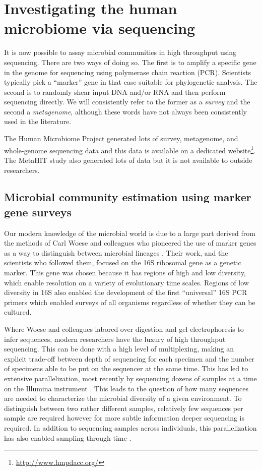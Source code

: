 \documentclass{amsart}
\begin{document}
\section{Investigating the human microbiome via sequencing}
It is now possible to assay microbial communities in high throughput using sequencing.
There are two ways of doing so.
The first is to amplify a specific gene in the genome for sequencing using polymerase chain reaction (PCR).
Scientists typically pick a ``marker'' gene in that case suitable for phylogenetic analysis.
The second is to randomly shear input DNA and/or RNA and then perform sequencing directly.
We will consistently refer to the former as a \textit{survey} and the second a \textit{metagenome}, although these words have not always been consistently used in the literature.

The Human Microbiome Project \citep{methe2012framework} generated lots of survey, metagenome, and whole-genome sequencing data and this data is available on a dedicated website\footnote{\url{http://www.hmpdacc.org/}}.
The MetaHIT study \citep{qin2010human} also generated lots of data but it is not available to outside researchers.

\subsection{Microbial community estimation using marker gene surveys}
Our modern knowledge of the microbial world is due to a large part derived from the methods of Carl Woese and colleagues who pioneered the use of marker genes as a way to distinguish between microbial lineages \citep{fox1977comparative}.
Their work, and the scientists who followed them, focused on the 16S ribosomal gene as a genetic marker.
This gene was chosen because it has regions of high and low diversity, which enable resolution on a variety of evolutionary time scales.
Regions of low diversity in 16S also enabled the development of the first ``universal'' 16S PCR primers \citep{lane1985rapid} which enabled surveys of all organisms regardless of whether they can be cultured.

Where Woese and colleagues labored over digestion and gel electrophoresis to infer sequences, modern researchers have the luxury of high throughput sequencing.
This can be done with a high level of multiplexing, making an explicit trade-off between depth of sequencing for each specimen and the number of specimens able to be put on the sequencer at the same time.
This has led to extensive parallelization, most recently by sequencing dozens of samples at a time on the Illumina instrument \citep{degnan2011illumina,caporaso2012ultra}.
This leads to the question of how many sequences are needed to characterize the microbial diversity of a given environment.
To distinguish between two rather different samples, relatively few sequences per sample are required \citep{kuczynski2010microbial} however for more subtle information deeper sequencing is required.
In addition to sequencing samples across individuals, this parallelization has also enabled sampling through time \citep{caporaso2011moving}.
\end{document}
